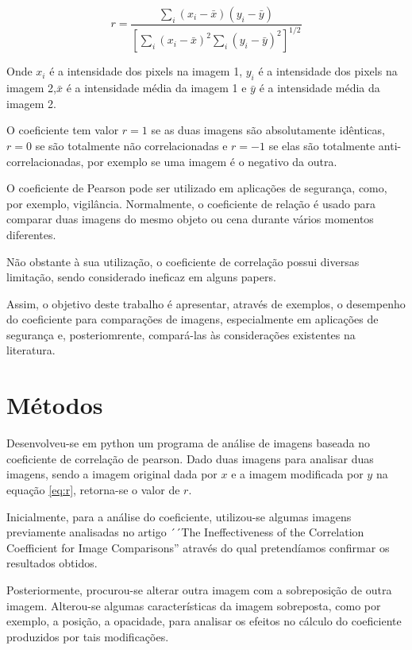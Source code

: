\documentclass[10pt,a4paper]{article}
\begin{document}
\begin{equation}r = \frac{  
\displaystyle{\sum_{i} (x_i-\bar{x})(y_i-  
\bar{y})}}{\displaystyle{\left[  
\sum_{i}(x_i-\bar{x})^2  
\sum_{i}(y_i-\bar{y})^2\right]^{1/2}}}  \label{eq:r}
\end{equation}  

Onde $x_i$ é a intensidade dos pixels na imagem 1, $y_i$ é a
intensidade dos pixels na imagem 2,$\bar{x}$ é a intensidade média da
imagem 1 e $\bar{y}$ é a intensidade média da imagem 2.

O coeficiente tem valor $r=1$ se as duas imagens são absolutamente
idênticas, $r=0$ se são totalmente não correlacionadas e $r=-1$ se elas
são totalmente anti-correlacionadas, por exemplo se uma imagem é o
negativo da outra.

O coeficiente de Pearson pode ser utilizado em
aplicações de segurança, como, por exemplo, vigilância. Normalmente, 
o coeficiente de relação é usado para comparar duas imagens do mesmo
objeto ou cena durante vários momentos diferentes.

Não obstante à sua utilização, o coeficiente de correlação possui
diversas limitação, sendo considerado ineficaz em alguns papers.%
 
Assim, o objetivo deste trabalho é apresentar, através de exemplos, o
desempenho do coeficiente para comparações de imagens, especialmente
em aplicações de segurança e, posteriomrente, compará-las às considerações existentes na literatura.


\section{Métodos}

Desenvolveu-se em python um programa de análise de imagens baseada no
coeficiente de correlação de pearson. 
Dado duas imagens para analisar duas imagens, sendo a imagem original dada por $x$  e a
imagem modificada por $y$ na equação \eqref{eq:r}, retorna-se o valor de $r$.

Inicialmente, para a análise do coeficiente, utilizou-se algumas imagens
previamente analisadas no artigo ´´The Ineffectiveness of the Correlation
Coefficient for Image Comparisons'' através do qual pretendíamos
confirmar os resultados obtidos.

Posteriormente, procurou-se alterar outra imagem com a
sobreposição de outra imagem. Alterou-se algumas características da
imagem sobreposta, como por exemplo, a posição, a opacidade, para
analisar os efeitos no cálculo do coeficiente produzidos por tais modificações. 
\end{document}

